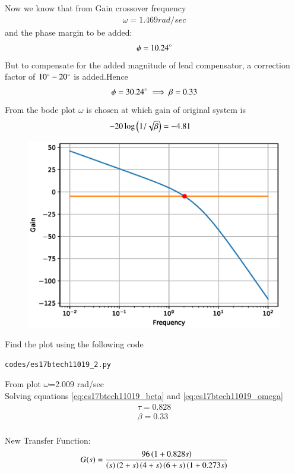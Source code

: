 Now we know that from Gain crossover frequency
\begin{align}
\omega =1.469 rad/sec
\end{align}
and the phase margin to be added:
\begin{align}
\phi =10.24\degree
\end{align}
But to compensate for the added magnitude of lead compensator, a correction factor of $10\degree-20\degree$
is added.Hence
\begin{align}
\phi =30.24\degree
\implies \beta=0.33
\end{align}
From the bode plot $\omega$ is chosen at which gain of original system is
\begin{align}
-20\log\left(1/\sqrt{\beta}\right)&=-4.81
\end{align}
\begin{figure}[!ht]
  \centering
  \includegraphics[width=\columnwidth]{./figs/es17btech11019_3.eps}
  \caption{}
  \label{fig:es17btech11019_3}
\end{figure}
Find the plot using the following code
\begin{lstlisting}
codes/es17btech11019_2.py
\end{lstlisting}
From plot $\omega$=2.009 rad/sec\\
Solving equations \ref{eq:es17btech11019_beta} and \ref{eq:es17btech11019_omega}
\begin{align}
\tau= 0.828\\
\beta=0.33\\
\label{eq:es17btech11019_final}
\end{align}

New Transfer Function:
\begin{align}
G(s)=\frac{96\left(1+ 0.828s\right)}{\left(s\right)\left(2+s\right)\left(4+s\right)\left(6+s\right)\left(1+0.273s\right)}
\end{align}




